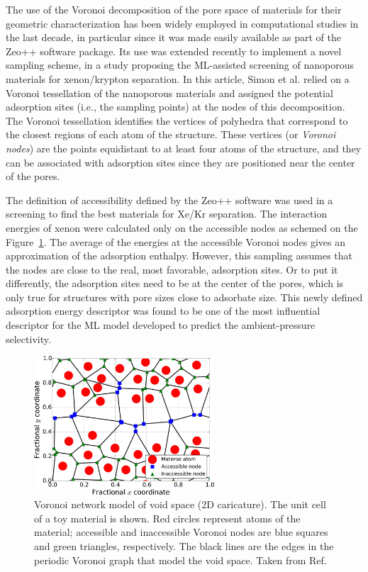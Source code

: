 \documentclass[main]{subfiles}
\begin{document}
The use of the Voronoi decomposition of the pore space of materials for their geometric characterization has been widely employed in computational studies in the last decade,\cite{Willems_2012} in particular since it was made easily available as part of the Zeo++ software package.\cite{Pinheiro2013} Its use was extended recently to implement a novel sampling scheme, in a study proposing the ML-assisted screening of nanoporous materials for xenon/krypton separation. In this article, Simon et al.\cite{Simon_2015} relied on a Voronoi tessellation of the nanoporous materials and assigned the potential adsorption sites (i.e., the sampling points) at the nodes of this decomposition. The Voronoi tessellation identifies the vertices of polyhedra that correspond to the closest regions of each atom of the structure. These vertices (or \emph{Voronoi nodes}) are the points equidistant to at least four atoms of the structure, and they can be associated with adsorption sites since they are positioned near the center of the pores. 

The definition of accessibility defined by the Zeo++ software was used in a screening to find the best materials for Xe/Kr separation.\cite{Simon_2015} The interaction energies of xenon were calculated only on the accessible nodes as schemed on the Figure~\ref{fgr:simon_voro}. The average of the energies at the accessible Voronoi nodes gives an approximation of the adsorption enthalpy. However, this sampling assumes that the nodes are close to the real, most favorable, adsorption sites. Or to put it differently, the adsorption sites need to be at the center of the pores, which is only true for structures with pore sizes close to adsorbate size. This newly defined adsorption energy descriptor was found to be one of the most influential descriptor for the ML model developed to predict the ambient-pressure selectivity. 

\begin{figure}
  \centering
  \includegraphics[width=0.6\textwidth]{figures/3-fastsim/Simon_voronoi.jpeg}
  \caption{Voronoi network model of void space (2D caricature). The unit cell of a toy material is shown. Red circles represent atoms of the material; accessible and inaccessible Voronoi nodes are blue squares and green triangles, respectively. The black lines are the edges in the periodic Voronoi graph that model the void space. Taken from Ref.~\cite{Simon_2015}}\label{fgr:simon_voro}
\end{figure}
\end{document}
